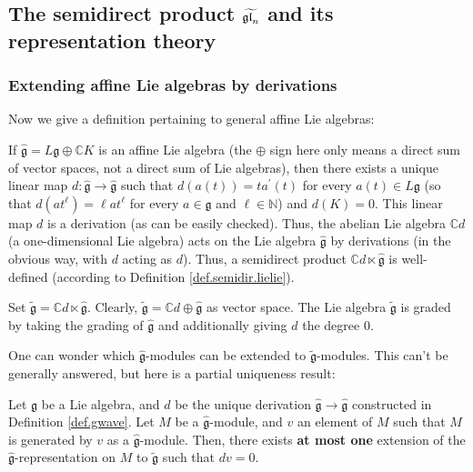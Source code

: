 \documentclass[etingof-lie.tex]{subfiles}
\begin{document}
\subsection{The semidirect product
\texorpdfstring{$\protect\widetilde{\mathfrak{gl}_{n}}$}{gl-n-tilde} and its
representation theory}

\subsubsection{Extending affine Lie algebras by derivations}

Now we give a definition pertaining to general affine Lie algebras:

\begin{definition}
\label{def.gwave}If $\widehat{\mathfrak{g}}=L\mathfrak{g}\oplus\mathbb{C}K$ is
an affine Lie algebra (the $\oplus$ sign here only means a direct sum of
vector spaces, not a direct sum of Lie algebras), then there exists a unique
linear map $d:\widehat{\mathfrak{g}}\rightarrow\widehat{\mathfrak{g}}$ such
that $d\left(  a\left(  t\right)  \right)  =ta^{\prime}\left(  t\right)  $ for
every $a\left(  t\right)  \in L\mathfrak{g}$ (so that $d\left(  at^{\ell
}\right)  =\ell at^{\ell}$ for every $a\in\mathfrak{g}$ and $\ell\in
\mathbb{N}$) and $d\left(  K\right)  =0$. This linear map $d$ is a derivation
(as can be easily checked). Thus, the abelian Lie algebra $\mathbb{C}d$ (a
one-dimensional Lie algebra) acts on the Lie algebra $\widehat{\mathfrak{g}}$
by derivations (in the obvious way, with $d$ acting as $d$). Thus, a
semidirect product $\mathbb{C}d\ltimes\widehat{\mathfrak{g}}$ is well-defined
(according to Definition \ref{def.semidir.lielie}).

Set $\widetilde{\mathfrak{g}}=\mathbb{C}d\ltimes\widehat{\mathfrak{g}}$.
Clearly, $\widetilde{\mathfrak{g}}=\mathbb{C}d\oplus\widehat{\mathfrak{g}}$ as
vector space. The Lie algebra $\widetilde{\mathfrak{g}}$ is graded by taking
the grading of $\widehat{\mathfrak{g}}$ and additionally giving $d$ the degree
$0$.
\end{definition}

One can wonder which $\widehat{\mathfrak{g}}$-modules can be extended to
$\widetilde{\mathfrak{g}}$-modules. This can't be generally answered, but here
is a partial uniqueness result:

\begin{lemma}
\label{lem.gwave.uniqueder}Let $\mathfrak{g}$ be a Lie algebra, and $d$ be the
unique derivation $\widehat{\mathfrak{g}}\rightarrow\widehat{\mathfrak{g}}$
constructed in Definition \ref{def.gwave}. Let $M$ be a $\widehat{\mathfrak{g}%
}$-module, and $v$ an element of $M$ such that $M$ is generated by $v$ as a
$\widehat{\mathfrak{g}}$-module. Then, there exists \textbf{at most one}
extension of the $\widehat{\mathfrak{g}}$-representation on $M$ to
$\widetilde{\mathfrak{g}}$ such that $dv=0$.
\end{lemma}
\end{document}
